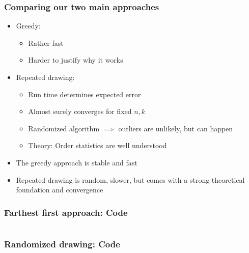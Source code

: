 \documentclass[10pt,aspectratio=169,handout]{beamer}
\begin{document}
\begin{frame}
    \frametitle{Comparing our two main approaches}

    \begin{itemize}
        \item Greedy:\begin{itemize}
            \item Rather fast
            \item Harder to justify why it works
        \end{itemize}
        \item Repeated drawing:
        \begin{itemize}
            \item Run time determines expected error
            \item Almost surely converges for fixed $n,k$
            \item Randomized algorithm $\implies$ outliers are unlikely, but can happen 
            \item Theory: Order statistics are well understood
        \end{itemize}
        \item The greedy approach is stable and fast 
        \item Repeated drawing is random, slower, but comes with a strong theoretical foundation and convergence
    \end{itemize}

\end{frame}

\begin{frame}
    \frametitle{Farthest first approach: Code}

    \inputminted[bgcolor=LightGray,fontsize=\small]{python}{code/farthest-first.py}

\end{frame}

\begin{frame}
    \frametitle{Randomized drawing: Code}

    \inputminted[bgcolor=LightGray,fontsize=\small]{python}{code/randomized_drawing.py}

\end{frame}
\end{document}
